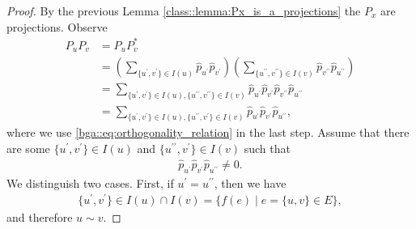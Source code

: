 \documentclass[a4paper]{amsart}
\begin{document}
\begin{proof}
    By the previous Lemma \ref{class::lemma:Px_is_a_projections} the $P_x$ are projections. Observe 
    \begin{align*}
        P_u P_v 
            &= P_u P_v^\ast \\
            &= \left( \sum_{\{u^\prime, v^\prime\} \in I(u)} \hat{p}_{u^\prime} \hat{p}_{v^\prime} \right)
                \left( \sum_{\{u^{\prime\prime}, v^{\prime\prime}\} \in I(v)} \hat{p}_{v^{\prime\prime}} \hat{p}_{u^{\prime\prime}} \right) \\
            &= \sum_{\{u^\prime, v^\prime\} \in I(u), \{u^{\prime\prime}, v^{\prime\prime}\} \in I(v)} \hat{p}_{u^\prime} \hat{p}_{v^\prime} \hat{p}_{v^{\prime\prime}} \hat{p}_{u^{\prime\prime}} \\
            &= \sum_{\{u^\prime, v^\prime\} \in I(u), \{u^{\prime\prime}, v^{\prime}\} \in I(v)} \hat{p}_{u^\prime} \hat{p}_{v^\prime} \hat{p}_{u^{\prime\prime}},
    \end{align*}
    where we use \eqref{bga::eq:orthogonality_relation} in the last step.
    Assume that there are some $\{u^\prime, v^\prime\} \in I(u)$ and $\{u^{\prime\prime}, v^\prime\} \in I(v)$ such that 
    \begin{align*}
        \hat{p}_{u^\prime} \hat{p}_{v^\prime} \hat{p}_{u^{\prime\prime}} \neq 0.
    \end{align*}
    We distinguish two cases. First, if $u^\prime = u^{\prime\prime}$, then we have
    \begin{align*}
        \{u^\prime, v^\prime\} \in I(u) \cap I(v) = \{f(e) \mid e = \{u,v\} \in E\},
    \end{align*}
    and therefore $u \sim v$.


\end{proof}
\end{document}
